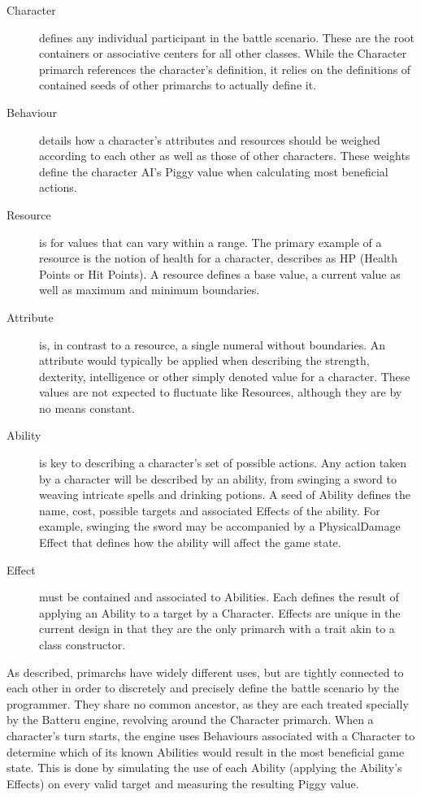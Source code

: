\begin{description}
	\item[Character] defines any individual participant in the battle scenario. These are the root containers or associative centers for all other classes. While the Character primarch references the character's definition, it relies on the definitions of contained seeds of other primarchs to actually define it.
	\item[Behaviour] details how a character's attributes and resources should be weighed according to each other as well as those of other characters. These weights define the character AI's Piggy value when calculating most beneficial actions.
	\item[Resource] is for values that can vary within a range. The primary example of a resource is the notion of health for a character, describes as HP (Health Points or Hit Points). A resource defines a base value, a current value as well as maximum and minimum boundaries.
	\item[Attribute] is, in contrast to a resource, a single numeral without boundaries. An attribute would typically be applied when describing the strength, dexterity, intelligence or other simply denoted value for a character. These values are not expected to fluctuate like Resources, although they are by no means constant.
	\item[Ability] is key to describing a character's set of possible actions. Any action taken by a character will be described by an ability, from swinging a sword to weaving intricate spells and drinking potions. A seed of Ability defines the name, cost, possible targets and associated Effects of the ability. For example, swinging the sword may be accompanied by a PhysicalDamage Effect that defines how the ability will affect the game state.
	\item[Effect] must be contained and associated to Abilities. Each defines the result of applying an Ability to a target by a Character. Effects are unique in the current design  in that they are the only primarch with a trait akin to a class constructor.
\end{description}

As described, primarchs have widely different uses, but are tightly connected to each other in order to discretely and precisely define the battle scenario by the programmer. They share no common ancestor, as they are each treated specially by the Batteru engine, revolving around the Character primarch. When a character's turn starts, the engine uses Behaviours associated with a Character to determine which of its known Abilities would result in the most beneficial game state. This is done by simulating the use of each Ability (applying the Ability's Effects) on every valid target and measuring the resulting Piggy value.

